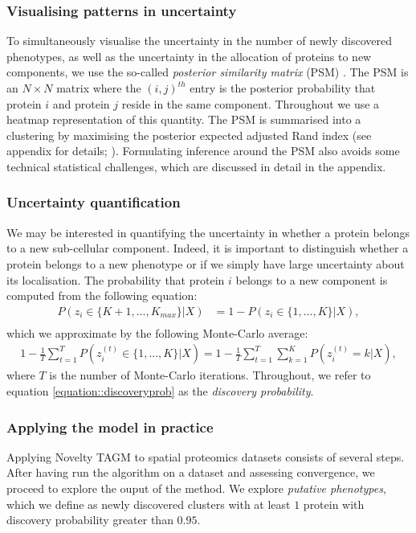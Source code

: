 \documentclass[12pt,english]{article}
\begin{document}
\subsubsection{Visualising patterns in uncertainty}
To simultaneously visualise the uncertainty in the number of newly discovered phenotypes, as well as the uncertainty in the allocation of proteins to new components, we use the so-called \textit{posterior similarity matrix} (PSM) \citep{fritsch::2009}. The PSM is an $N\times N$ matrix where the $(i,j)^{th}$ entry is the posterior probability that protein $i$ and protein $j$ reside in the same component. Throughout we use a heatmap representation of this quantity. The PSM is summarised into a clustering by maximising the posterior expected adjusted Rand index (see appendix for details; \citep{fritsch::2009}). Formulating inference around the PSM also avoids some technical statistical challenges, which are discussed in detail in the appendix.

\subsubsection{Uncertainty quantification}
We may be interested in quantifying the uncertainty in whether a protein belongs to a new sub-cellular component. Indeed, it is important to distinguish whether a protein belongs to a new phenotype or if we simply have large uncertainty about its localisation. The probability that protein $i$ belongs to a new component is computed from the following equation:
\begin{align}
P(z_i \in \{K + 1,..., K_{max}\}|X) & = 1 - P(z_i \in \{1,..., K\}|X), \\ 
\end{align}
which we approximate by the following Monte-Carlo average:
\begin{align}\label{equation::discoveryprob}
1 - \frac{1}{T} \sum_{t = 1}^{T}P(z^{(t)}_i \in \{1,..., K\}|X)= 1 - \frac{1}{T} \sum_{t = 1}^{T} \sum_{k=1}^KP(z^{(t)}_i = k|X),
\end{align}
where $T$ is the number of Monte-Carlo iterations. Throughout, we refer to equation \ref{equation::discoveryprob} as the \textit{discovery probability}.
\subsubsection{Applying the model in practice}
Applying Novelty TAGM to spatial proteomics datasets consists of several steps. After having run the algorithm on a dataset and assessing convergence, we proceed to explore the ouput of the method. We explore \textit{putative phenotypes}, which we define as newly discovered clusters with at least $1$ protein with discovery probability greater than $0.95$.
\end{document}
